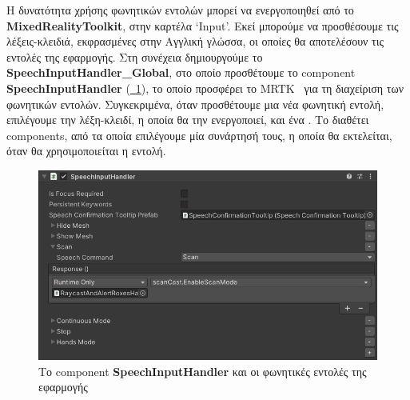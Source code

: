 Η δυνατότητα χρήσης φωνητικών εντολών μπορεί να ενεργοποιηθεί από το \textbf{MixedRealityToolkit}, στην καρτέλα `Input'. Εκεί μπορούμε να προσθέσουμε τις λέξεις-κλειδιά, εκφρασμένες στην Αγγλική γλώσσα, οι οποίες θα αποτελέσουν τις εντολές της εφαρμογής. Στη συνέχεια δημιουργούμε το  \textbf{SpeechInputHandler\_Global}, στο οποίο προσθέτουμε το component \textbf{SpeechInputHandler} (\hyperref[fig:developVoiceCommands]{\schema~\ref*{fig:developVoiceCommands}}), το οποίο προσφέρει το MRTK~\cite{speechinputhandler} για τη διαχείριση των φωνητικών εντολών. Συγκεκριμένα, όταν προσθέτουμε μια νέα φωνητική εντολή, επιλέγουμε την λέξη-κλειδί, η οποία θα την ενεργοποιεί, και ένα . Το  διαθέτει components, από τα οποία επιλέγουμε μία συνάρτησή τους, η οποία θα εκτελείται, όταν θα χρησιμοποιείται η εντολή.

\begin{figure}[!h]
    \centering
    \includegraphics[width=1\textwidth]{images/develop_speechInputHandler.png}
    \caption{Το component \textbf{SpeechInputHandler} και οι φωνητικές εντολές της εφαρμογής}\label{fig:developVoiceCommands}
\end{figure}

